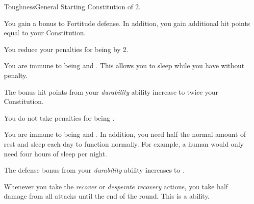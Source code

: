     \begin{feat}{Toughness}{General}
        \featpre Starting Constitution of 2.

         You gain a  bonus to Fortitude defense.
        In addition, you gain additional hit points equal to your Constitution.

         You reduce your penalties for being  by 2.

         You are immune to being  and .
        This allows you to sleep while you have  without penalty.

         The bonus hit points from your \textit{durability} ability increase to twice your Constitution.

         You do not take penalties for being .

         You are immune to being  and .
        In addition, you need half the normal amount of rest and sleep each day to function normally.
        For example, a human would only need four hours of sleep per night.

         The defense bonus from your \textit{durability} ability increases to .

         Whenever you take the \textit{recover} or \textit{desperate recovery} actions, you take half damage from all attacks until the end of the round.
        This is a  ability.
    \end{feat}

